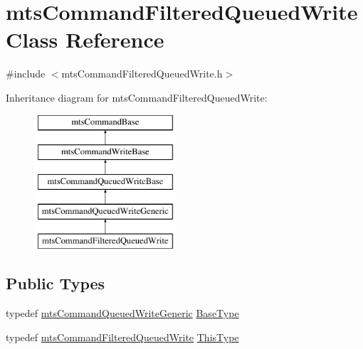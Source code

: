 \hypertarget{classmts_command_filtered_queued_write}{}\section{mts\+Command\+Filtered\+Queued\+Write Class Reference}
\label{classmts_command_filtered_queued_write}


{\ttfamily \#include $<$mts\+Command\+Filtered\+Queued\+Write.\+h$>$}

Inheritance diagram for mts\+Command\+Filtered\+Queued\+Write\+:\begin{figure}[H]
\begin{center}
\leavevmode
\includegraphics[height=5.000000cm]{d9/d52/classmts_command_filtered_queued_write}
\end{center}
\end{figure}
\subsection*{Public Types}
\begin{DoxyCompactItemize}
\item 
typedef \hyperlink{classmts_command_queued_write_generic}{mts\+Command\+Queued\+Write\+Generic} \hyperlink{classmts_command_filtered_queued_write_af9539c71a0b5815f2206641041dfdd60}{Base\+Type}
\item 
typedef \hyperlink{classmts_command_filtered_queued_write}{mts\+Command\+Filtered\+Queued\+Write} \hyperlink{classmts_command_filtered_queued_write_a155aa724cca736441779aaa34b7f5c6e}{This\+Type}
\end{DoxyCompactItemize}
